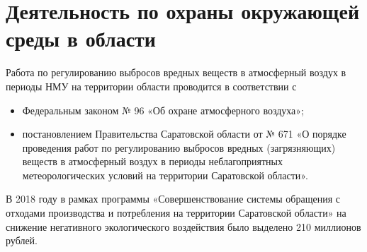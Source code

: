 \section{Деятельность по охраны окружающей среды в области}
\begin{frame}{\insertsectionhead}
    \footnotesize
    Работа по регулированию выбросов вредных веществ в атмосферный воздух в периоды НМУ на 
    территории области проводится в соответствии с 
    \begin{itemize}
        \item Федеральным законом № 96 «Об охране атмосферного воздуха»;
        \item постановлением Правительства Саратовской области 
        от № 671 «О порядке проведения работ по регулированию выбросов вредных
        (загрязняющих) веществ в атмосферный воздух в периоды неблагоприятных метеорологических условий
        на территории Саратовской области».
    \end{itemize}
    \smallskip

    В 2018 году в рамках программы «Совершенствование системы обращения с отходами производства и 
    потребления на территории Саратовской области» на снижение негативного экологического воздействия было выделено
    210 миллионов рублей.

\end{frame}
